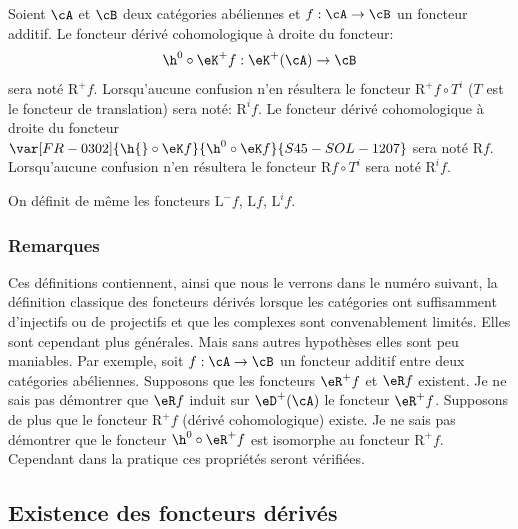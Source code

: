 Soient $\cA$ et $\cB$ deux catégories abéliennes et $f:\cA\to \cB$ un 
foncteur additif. Le foncteur dérivé cohomologique à droite du foncteur: 
\[
  \h^0{}\circ \eK^+ f:\eK^+(\cA) \to \cB 
\]
sera noté $\mathrm{R}^+ f$. Lorsqu'aucune confusion n'en résultera le foncteur 
$\mathrm{R}^+ f\circ T^i$ ($T$ est le foncteur de translation) sera noté: 
$\mathrm{R}^i f$. Le foncteur dérivé cohomologique à droite du foncteur 
$\var[FR-0302]{\h{}\circ \eK f}{\h^0{}\circ \eK f}{S45-SOL-1207}$ sera noté $\mathrm{R} f$. Lorsqu'aucune confusion n'en résultera 
le foncteur $\mathrm{R} f\circ T^i$ sera noté $\mathrm{R}^i f$. 

On définit de même les foncteurs $\mathrm{L}^- f$, $\mathrm{L} f$, $\mathrm{L}^i f$. 





\subsubsection{Remarques}\label{VIII:4-1-6}

Ces définitions contiennent, ainsi que nous le verrons dans le numéro 
suivant, la définition classique des foncteurs dérivés lorsque les 
catégories ont suffisamment d'injectifs ou de projectifs et que les complexes 
sont convenablement limités. Elles sont cependant plus générales. Mais 
sans autres hypothèses elles sont peu maniables. Par exemple, soit 
$f:\cA\to \cB$ un foncteur additif entre deux catégories abéliennes. 
Supposons que les foncteurs $\eR^+ f$ et $\eR f$ existent. Je ne sais pas 
démontrer que $\eR f$ induit sur $\eD^+(\cA)$ le foncteur $\eR^+ f$. Supposons 
de plus que le foncteur $\mathrm{R}^+ f$ (dérivé cohomologique) existe. Je ne sais 
pas démontrer que le foncteur $\h^0{}\circ \eR^+ f$ est isomorphe au foncteur 
$\mathrm{R}^+ f$. Cependant dans la pratique ces propriétés seront vérifiées. 










\subsection{Existence des foncteurs dérivés}\label{VIII:4-2}





